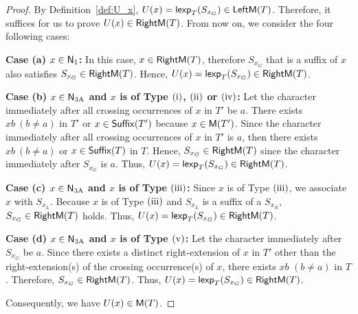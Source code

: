   \begin{proof}
    By Definition~\ref{def:U_x}, $U(x) = \mathsf{lexp}_T({S_{x_G}}) \in \mathsf{LeftM}(T)$.
    Therefore, it suffices for us to prove $U(x) \in \mathsf{RightM}(T)$.
    From now on, we consider the four following cases:

    \noindent \textbf{Case (a) $x \in \mathsf{N}_{\mathrm{1}}$:}
    In this case, $x \in \mathsf{RightM}(T)$, therefore $S_{x_{G}}$ that is a suffix of $x$ also satisfies $S_{x_{G}} \in \mathsf{RightM}(T)$.
    Hence, $U(x) = \mathsf{lexp}_T({S_{x_G}}) \in \mathsf{RightM}(T)$.

    \noindent \textbf{Case (b) $x \in \mathsf{N}_{\mathrm{3A}}$ and $x$ is of Type $\rm{(i)}$, $\rm{(ii)}$ or $\rm{(iv)}$:}
    Let the character immediately after all crossing occurrences of $x$ in $T'$ be $a$.
    There exists $xb \: (b \ne a)$ in $T'$ or $x \in \mathsf{Suffix}(T')$ because $x \in \mathsf{M}(T')$.
    Since the character immediately after all crossing occurrences of $x$ in $T'$ is $a$, 
    then there exists $xb \: (b \ne a)$ or $x \in \mathsf{Suffix}(T)$ in $T$.
    Hence, $S_{x_{G}} \in \mathsf{RightM}(T)$ since the character immediately after $S_{x_{G}}$ is $a$.
    Thus, $U(x) = \mathsf{lexp}_T({S_{x_G}}) \in \mathsf{RightM}(T)$.

   \noindent \textbf{Case (c) $x \in \mathsf{N}_{\mathrm{3A}}$ and $x$ is of Type $\rm{(iii)}$:}
    Since $x$ is of Type $\rm{(iii)}$, we associate $x$ with $S_{x_L}$.
    Because $x$ is of Type $\rm{(iii)}$ and $S_{x_L}$ is a suffix of a $S_{x_ R}$, $S_{x_{G}} \in \mathsf{RightM}(T)$ holds.
    Thus, $U(x) = \mathsf{lexp}_T({S_{x_G}}) \in \mathsf{RightM}(T)$.

   \noindent \textbf{Case (d) $x \in \mathsf{N}_{\mathrm{3A}}$ and $x$ is of Type $\rm{(v)}$:}
    Let the character immediately after $S_{x_ G}$ be $a$.
    Since there exists a distinct right-extension of $x$ in $T'$ other than the right-extension(s) of the crossing occurrence(s) of $x$, there exists $xb$ $(b \neq a)$ in $T$.
    Therefore, $S_{x_ G} \in \mathsf{RightM}(T)$.
    Thus, $U(x) = \mathsf{lexp}_T({S_{x_G}}) \in \mathsf{RightM}(T)$.

    Consequently, we have $U(x) \in \mathsf{M}(T)$.
  \end{proof}

